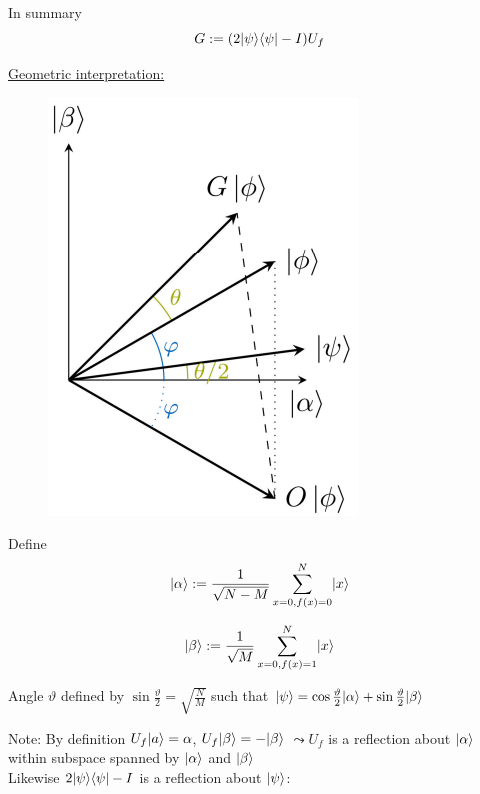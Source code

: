 In summary 
\begin{equation}
    G := (2 \lvert\psi\rangle \langle\psi\rvert - I) U_f
\end{equation}


\underline{Geometric interpretation:}

\begin{figure}[H]
    \centering
    \includegraphics[scale=0.5]{chapters/res/grover-geometric-representation.png}
\end{figure}

Define 
\begin{equation}
    \lvert\alpha\rangle := \frac{1}{\sqrt{N - M}} \sum_{x=0, f(x) = 0}^N \lvert x\rangle
\end{equation}

\begin{equation}
    \lvert\beta\rangle := \frac{1}{\sqrt{M}} \sum_{x=0, f(x) = 1}^N \lvert x\rangle
\end{equation}


Angle $\vartheta$ defined by $\sin \frac{\vartheta}{2} = \sqrt{\frac{N}{M}}$
such that $\lvert\psi\rangle = \cos \frac{\vartheta}{2} \lvert\alpha\rangle + \sin \frac{\vartheta}{2} \lvert\beta\rangle$


Note: By definition $U_f \lvert a\rangle = \alpha$, $U_f \lvert\beta\rangle = -\lvert\beta\rangle$ 
$\leadsto U_f$ is a reflection about $\lvert\alpha\rangle$ within subspace spanned by $\lvert\alpha\rangle$ and $\lvert\beta\rangle$ \\

Likewise $2 \lvert\psi\rangle \langle\psi\rvert - I$ is a reflection about $\lvert\psi\rangle$:


